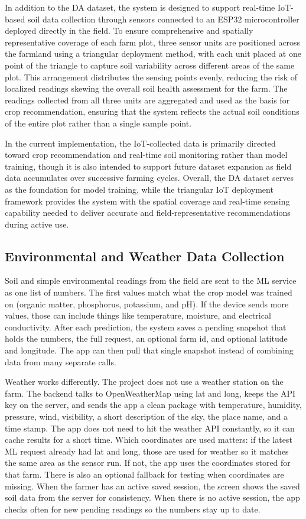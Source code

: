 {	In addition to the DA dataset, the system is designed to support real-time IoT-based soil data collection through sensors connected to an ESP32 microcontroller deployed directly in the field. To ensure comprehensive and spatially representative coverage of each farm plot, three sensor units are positioned across the farmland using a triangular deployment method, with each unit placed at one point of the triangle to capture soil variability across different areas of the same plot. This arrangement distributes the sensing points evenly, reducing the risk of localized readings skewing the overall soil health assessment for the farm. The readings collected from all three units are aggregated and used as the basis for crop recommendation, ensuring that the system reflects the actual soil conditions of the entire plot rather than a single sample point.
	
	In the current implementation, the IoT-collected data is primarily directed toward crop recommendation and real-time soil monitoring rather than model training, though it is also intended to support future dataset expansion as field data accumulates over successive farming cycles. Overall, the DA dataset serves as the foundation for model training, while the triangular IoT deployment framework provides the system with the spatial coverage and real-time sensing capability needed to deliver accurate and field-representative recommendations during active use.
	
	\subsection{Environmental and Weather Data Collection}
	Soil and simple environmental readings from the field are sent to the ML service as one list of numbers. The first values match what the crop model was trained on (organic matter, phosphorus, potassium, and pH). If the device sends more values, those can include things like temperature, moisture, and electrical conductivity. After each prediction, the system saves a pending snapshot that holds the numbers, the full request, an optional farm id, and optional latitude and longitude. The app can then pull that single snapshot instead of combining data from many separate calls.
	
	Weather works differently. The project does not use a weather station on the farm. The backend talks to OpenWeatherMap using lat and long, keeps the API key on the server, and sends the app a clean package with temperature, humidity, pressure, wind, visibility, a short description of the sky, the place name, and a time stamp. The app does not need to hit the weather API constantly, so it can cache results for a short time. Which coordinates are used matters: if the latest ML request already had lat and long, those are used for weather so it matches the same area as the sensor run. If not, the app uses the coordinates stored for that farm. There is also an optional fallback for testing when coordinates are missing. When the farmer has an active saved session, the screen shows the saved soil data from the server for consistency. When there is no active session, the app checks often for new pending readings so the numbers stay up to date.
	
}
